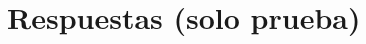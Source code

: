 \documentclass[12pt,a4paper]{article}
\begin{document}

\clearpage
\section*{Respuestas (solo prueba)}

\end{document}
